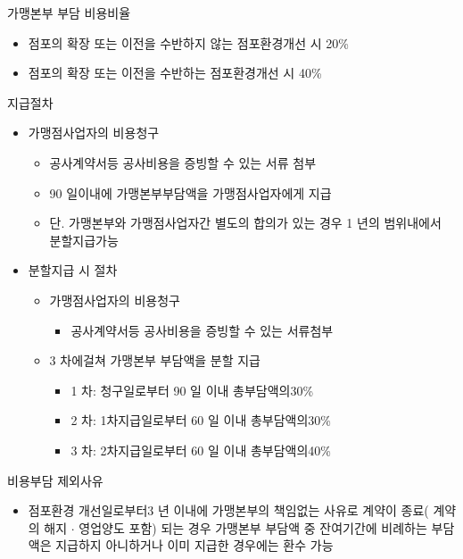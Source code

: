 \documentclass[a5paper,10pt]{oblivoir}
\begin{document}
\begin{enumerate}
\begin{tiny}
\begin{Form}
 가맹본부 부담 비용비율

\noindent\dotfill 
\begin{itemize}
\item 점포의 확장 또는 이전을 수반하지 않는 점포환경개선 시 20\%
\item 점포의 확장 또는 이전을 수반하는 점포환경개선 시 40\%
\end{itemize}

 지급절차

\noindent\dotfill 
\begin{itemize}
\item 가맹점사업자의 비용청구
\begin{itemize}
\item 공사계약서등 공사비용을 증빙할 수 있는 서류 첨부
\item 90 일이내에 가맹본부부담액을 가맹점사업자에게 지급
\item 단. 가맹본부와 가맹점사업자간 별도의 합의가 있는 경우 1 년의 범위내에서 분할지급가능
\end{itemize}
\item 분할지급 시 절차
\begin{itemize}
\item 가맹점사업자의 비용청구
\begin{itemize}
\item 공사계약서등 공사비용을 증빙할 수 있는 서류첨부
\end{itemize}
\item 3 차에걸쳐 가맹본부 부담액을 분할 지급
\begin{itemize}
\item 1 차: 청구일로부터 90 일 이내 총부담액의30\%
\item 2 차: 1차지급일로부터 60 일 이내 총부담액의30\%
\item 3 차: 2차지급일로부터 60 일 이내 총부담액의40\%
\end{itemize}
\end{itemize}
\end{itemize}

 비용부담 제외사유

\noindent\dotfill 
\begin{itemize}
\item 점포환경 개선일로부터3 년 이내에 가맹본부의 책임없는 사유로 계약이 종료( 계약의 해지 $\cdot$ 영업양도 포함) 되는 경우 가맹본부 부담액 중 잔여기간에 비례하는 부담액은 지급하지 아니하거나 이미 지급한 경우에는 환수 가능
\end{itemize}

\end{Form}
\end{tiny}


\end{enumerate}
\end{document}

